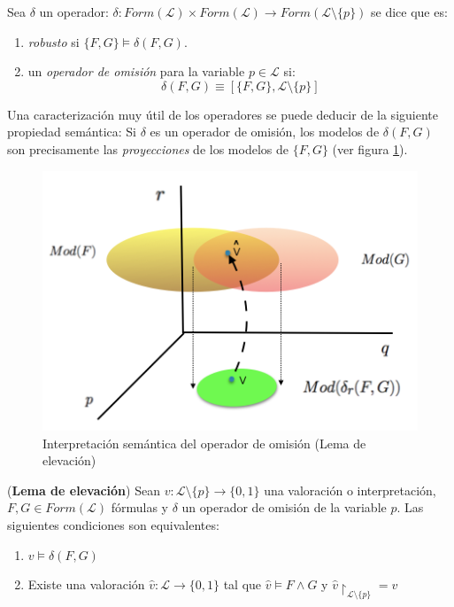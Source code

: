  Sea $\delta$ un operador: $\delta :Form(\mathcal{L}) \times Form(\mathcal{L}) \longrightarrow Form(\mathcal{L} \setminus \{ p \})$  se dice que es:

\begin{enumerate}
\item \textit{robusto} si $\{F,G\} \vDash \delta (F,G)$.
\item un \textit{operador de omisión} para la variable $p \in \mathcal{L}$ si:
$$\delta (F,G) \equiv [\{F,G\}, \mathcal{L} \setminus \{p\}]$$
\end{enumerate} 

Una caracterización muy útil de los operadores se puede deducir de la siguiente propiedad semántica: Si  $\delta$ es un operador de omisión, los modelos de $\delta (F,G)$ son precisamente las \textit{proyecciones} de los modelos de $\{ F,G \}$ (ver figura \ref{fig:proy}). 

\begin{figure}[h]
	\centering
		\includegraphics[scale=0.6]{imagenes/indemod.png}
	\caption{Interpretación semántica del operador de omisión (Lema de elevación)}
	\label{fig:proy}
\end{figure}

\lem \label{lem:lifting} (\textbf{Lema de elevación}) Sean $v :\mathcal{L} \setminus \{p\} \rightarrow \{ 0,1 \}$ una valoración o interpretación, $F, G \in Form(\mathcal{L})$ fórmulas y $\delta$ un operador de omisión de la variable $p$. Las siguientes condiciones son equivalentes:
\begin{enumerate}
\item $v \vDash \delta (F,G)$
\item Existe una valoración $\hat{v} : \mathcal{L} \rightarrow \{ 0,1 \}$ tal que $\hat{v} \vDash F \wedge G$ y $\hat{v} \upharpoonright_{\mathcal{L} \setminus \{ p \}} = v $
\end{enumerate}

